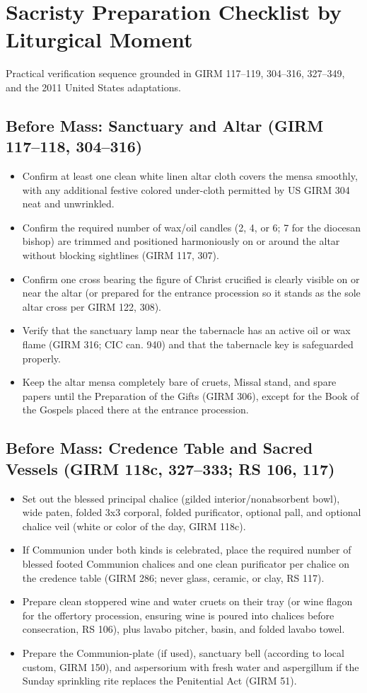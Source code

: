 \clearpage
\section{Sacristy Preparation Checklist by Liturgical Moment}
Practical verification sequence grounded in GIRM 117--119, 304--316, 327--349, and the 2011 United States adaptations.

\subsection*{Before Mass: Sanctuary and Altar (GIRM 117--118, 304--316)}
\begin{itemize}
\item Confirm at least one clean white linen altar cloth covers the mensa smoothly, with any additional festive colored under-cloth permitted by US GIRM 304 neat and unwrinkled.
\item Confirm the required number of wax/oil candles (2, 4, or 6; 7 for the diocesan bishop) are trimmed and positioned harmoniously on or around the altar without blocking sightlines (GIRM 117, 307).
\item Confirm one cross bearing the figure of Christ crucified is clearly visible on or near the altar (or prepared for the entrance procession so it stands as the sole altar cross per GIRM 122, 308).
\item Verify that the sanctuary lamp near the tabernacle has an active oil or wax flame (GIRM 316; CIC can. 940) and that the tabernacle key is safeguarded properly.
\item Keep the altar mensa completely bare of cruets, Missal stand, and spare papers until the Preparation of the Gifts (GIRM 306), except for the Book of the Gospels placed there at the entrance procession.
\end{itemize}
\subsection*{Before Mass: Credence Table and Sacred Vessels (GIRM 118c, 327--333; RS 106, 117)}
\begin{itemize}
\item Set out the blessed principal chalice (gilded interior/nonabsorbent bowl), wide paten, folded 3x3 corporal, folded purificator, optional pall, and optional chalice veil (white or color of the day, GIRM 118c).
\item If Communion under both kinds is celebrated, place the required number of blessed footed Communion chalices and one clean purificator per chalice on the credence table (GIRM 286; never glass, ceramic, or clay, RS 117).
\item Prepare clean stoppered wine and water cruets on their tray (or wine flagon for the offertory procession, ensuring wine is poured into chalices before consecration, RS 106), plus lavabo pitcher, basin, and folded lavabo towel.
\item Prepare the Communion-plate (if used), sanctuary bell (according to local custom, GIRM 150), and aspersorium with fresh water and aspergillum if the Sunday sprinkling rite replaces the Penitential Act (GIRM 51).
\end{itemize}
